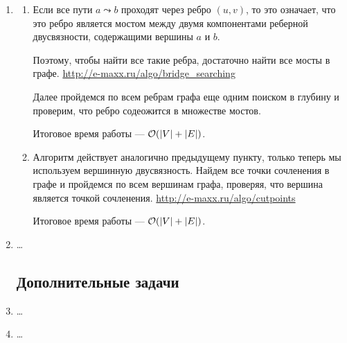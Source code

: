 \begin{enumerate}
\item

    \begin{enumerate}

    \item

        Если все пути $a \leadsto b$ проходят через ребро $(u, v)$, то это означает, что
        это ребро является мостом между двумя компонентами реберной двусвязности, содержащими
        вершины $a$ и $b$.

        Поэтому, чтобы найти все такие ребра, достаточно найти все мосты в графе. \newline
        \url{http://e-maxx.ru/algo/bridge_searching}

        Далее пройдемся по всем ребрам графа еще одним поиском в глубину и проверим, что
        ребро содеожится в множестве мостов.

        Итоговое время работы --- $\mathcal{O}(|V| + |E|)$.

    \item

        Алгоритм действует аналогично предыдущему пункту, только теперь мы используем
        вершинную двусвязность. Найдем все точки сочленения в графе и пройдемся по всем вершинам
        графа, проверяя, что вершина является точкой сочленения. \newline
        \url{http://e-maxx.ru/algo/cutpoints}

        Итоговое время работы --- $\mathcal{O}(|V| + |E|)$.

    \end{enumerate}

\item \dots

\subsection*{Дополнительные задачи}

\item \dots

\item \dots

\end{enumerate}
